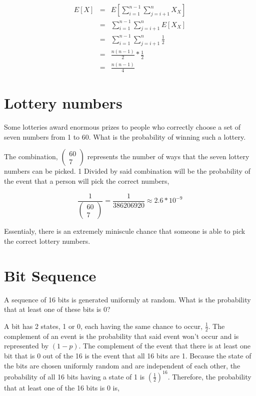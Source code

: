 \documentclass[11pt]{article}
\begin{document}
\begin{eqnarray*}
E[X] &=& E[\sum_{i=1}^{n-1} \sum_{j=i+1}^{n} X_X] \\
	&=& \sum_{i=1}^{n-1} \sum_{j=i+1}^{n} E[X_X] \\
	&=& \sum_{i=1}^{n-1} \sum_{j=i+1}^{n} \frac{1}{2} \\
	&=& \frac{n(n-1)}{2} * \frac{1}{2} \\
	&=& \frac{n(n-1)}{4}
\end{eqnarray*}

\section{Lottery numbers}%
Some lotteries award enormous prizes to people who correctly choose a set of seven numbers from 1 to 60. What is the probability of winning such a lottery.


\bigskip
\bigskip

The combination,
$ \left(\!
\begin{array}{c}
	60 \\
	7
\end{array}
 \!\right)$
represents the number of ways that the seven lottery numbers can be picked. 1 Divided by said combination will be the probability of the event that a person will pick the correct numbers,

\begin{equation*}
\frac{1}{
\left(\!
\begin{array}{c}
	60 \\
	7
\end{array}
 \!\right)
} = \frac{1}{386206920} \approx 2.6*10^{-9}
\end{equation*}

Essentialy, there is an extremely miniscule chance that someone is able to pick the correct lottery numbers.


\section{Bit Sequence} %
A sequence of 16 bits is generated uniformly at random. What is the probability that at least one of these bits is 0?

\bigskip
\bigskip

A bit has 2 states, 1 or 0, each having the same chance to occur, $\frac{1}{2}$. The complement of an event is the probability that said event won't occur and is represented by $(1-p)$. The complement of the event that there is at least one bit that is 0 out of the 16 is the event that all 16 bits are 1. Because the state of the bits are chosen uniformly random and are independent of each other, the probability of all 16 bits having a state of 1 is $(\frac{1}{2})^{16}$. Therefore, the probability that at least one of the 16 bits is 0 is,
\end{document}
